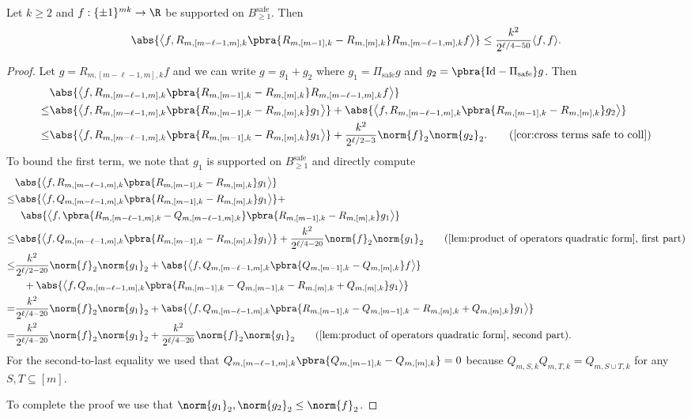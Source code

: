 \begin{corollary}\label{cor:square terms safe to safe}
    Let $k\geq 2$ and $f:\{\pm1\}^{mk}\to\R$ be supported on $B_{\geq 1}^{\mathrm{safe}}$. Then 
    \begin{align*}
        \abs{\left\langle f,R_{m,[m-\ell-1,m],k}\pbra{R_{m,[m-1],k}-R_{m,[m],k}}R_{m,[m-\ell-1,m],k}f\right\rangle }\leq \frac{k^2}{2^{\ell/4-50}}\langle f,f\rangle.
    \end{align*}
\end{corollary}
\begin{proof}
    Let $g=R_{m,[m-\ell-1,m],k}f$ and we can write $g=g_1+g_2$ where $g_1=\Pi_{\mathrm{safe}}g$ and $g_2=\pbra{\mathrm{Id}-\Pi_{\mathrm{safe}}}g$. Then
    \begin{align*}
        &\abs{\left\langle f,R_{m,[m-\ell-1,m],k}\pbra{R_{m,[m-1],k}-R_{m,[m],k}}R_{m,[m-\ell-1,m],k}f\right\rangle }\\
        \leq&\abs{\left\langle f,R_{m,[m-\ell-1,m],k}\pbra{R_{m,[m-1],k}-R_{m,[m],k}}g_1\right\rangle }+\abs{\left\langle f,R_{m,[m-\ell-1,m],k}\pbra{R_{m,[m-1],k}-R_{m,[m],k}}g_2\right\rangle }\\
        \leq&\abs{\left\langle f,R_{m,[m-\ell-1,m],k}\pbra{R_{m,[m-1],k}-R_{m,[m],k}}g_1\right\rangle }+\frac{k^2}{2^{\ell/2-3}}\norm{f}_2\norm{g_2}_2.\tag{\Cref{cor:cross terms safe to coll}}
    \end{align*}
    To bound the first term, we note that $g_1$ is supported on $B_{\geq1}^{\mathrm{safe}}$ and directly compute
    \begin{align*}
        &\abs{\left\langle f,R_{m,[m-\ell-1,m],k}\pbra{R_{m,[m-1],k}-R_{m,[m],k}}g_1\right\rangle }\\
        \leq&\abs{\left\langle f,Q_{m,[m-\ell-1,m],k}\pbra{R_{m,[m-1],k}-R_{m,[m],k}}g_1\right\rangle }+\\
        &\;\;\abs{\left\langle f,\pbra{R_{m,[m-\ell-1,m],k}-Q_{m,[m-\ell-1,m],k}}\pbra{R_{m,[m-1],k}-R_{m,[m],k}}g_1\right\rangle }\\
        \leq &\abs{\left\langle f,Q_{m,[m-\ell-1,m],k}\pbra{R_{m,[m-1],k}-R_{m,[m],k}}g_1\right\rangle }+\frac{k^2}{2^{\ell/4-20}}\norm{f}_2\norm{g_1}_2\tag{\Cref{lem:product of operators quadratic form}, first part}\\
        \leq &\frac{k^2}{2^{\ell/2-20}}\norm{f}_2\norm{g_1}_2+\abs{\left\langle f,Q_{m,[m-\ell-1,m],k}\pbra{Q_{m,[m-1],k}-Q_{m,[m],k}}f\right\rangle }\\
        &\;\;\;+\abs{\left\langle f,Q_{m,[m-\ell-1,m],k}\pbra{R_{m,[m-1],k}-Q_{m,[m-1],k}-R_{m,[m],k}+Q_{m,[m],k}}g_1\right\rangle }\\
        = &\frac{k^2}{2^{\ell/4-20}}\norm{f}_2\norm{g_1}_2+\abs{\left\langle f,Q_{m,[m-\ell-1,m],k}\pbra{R_{m,[m-1],k}-Q_{m,[m-1],k}-R_{m,[m],k}+Q_{m,[m],k}}g_1\right\rangle}\\
        =&\frac{k^2}{2^{\ell/4-20}}\norm{f}_2\norm{g_1}_2+\frac{k^2}{2^{\ell/4-20}}\norm{f}_2\norm{g_1}_2\tag{\Cref{lem:product of operators quadratic form}, second part}.
    \end{align*}
    For the second-to-last equality we used that $Q_{m,[m-\ell-1,m],k}\pbra{Q_{m,[m-1],k}-Q_{m,[m],k}}=0$ because $Q_{m,S,k}Q_{m,T,k}=Q_{m,S\cup T,k}$ for any $S,T\subseteq[m]$.

    To complete the proof we use that $\norm{g_1}_2,\norm{g_2}_2\leq \norm{f}_2$.
\end{proof}


